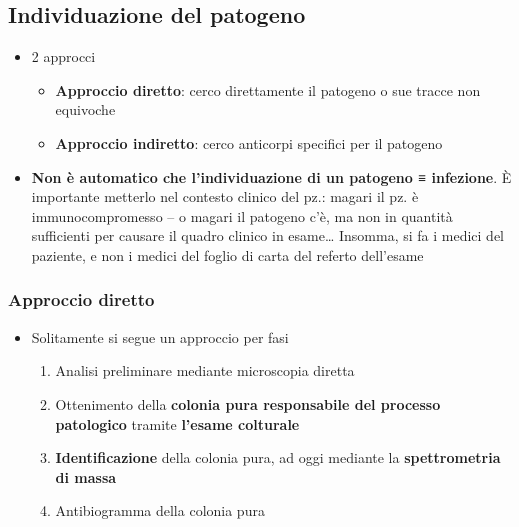 \documentclass[italian,]{article}
\providecommand{\tightlist}{%
  \setlength{\itemsep}{0pt}\setlength{\parskip}{0pt}}
\begin{document}
\hypertarget{individuazione-del-patogeno}{%
\subsection{Individuazione del
patogeno}\label{individuazione-del-patogeno}}

\begin{itemize}
\tightlist
\item
  2 approcci

  \begin{itemize}
  \tightlist
  \item
    \textbf{Approccio diretto}: cerco direttamente il patogeno o sue
    tracce non equivoche
  \item
    \textbf{Approccio indiretto}: cerco anticorpi specifici per il
    patogeno
  \end{itemize}
\item
  \textbf{Non è automatico che l'individuazione di un patogeno ≡
  infezione}. È importante metterlo nel contesto clinico del pz.: magari
  il pz. è immunocompromesso -- o magari il patogeno c'è, ma non in
  quantità sufficienti per causare il quadro clinico in esame\ldots{}
  Insomma, si fa i medici del paziente, e non i medici del foglio di
  carta del referto dell'esame
\end{itemize}

\hypertarget{approccio-diretto}{%
\subsubsection{Approccio diretto}\label{approccio-diretto}}

\begin{itemize}
\tightlist
\item
  Solitamente si segue un approccio per fasi

  \begin{enumerate}
  \def\labelenumi{\arabic{enumi}.}
  \tightlist
  \item
    Analisi preliminare mediante microscopia diretta
  \item
    Ottenimento della \textbf{colonia pura responsabile del processo
    patologico} tramite \textbf{l'esame colturale}
  \item
    \textbf{Identificazione} della colonia pura, ad oggi mediante la
    \textbf{spettrometria di massa}
  \item
    Antibiogramma della colonia pura
  \end{enumerate}
\end{itemize}
\end{document}

